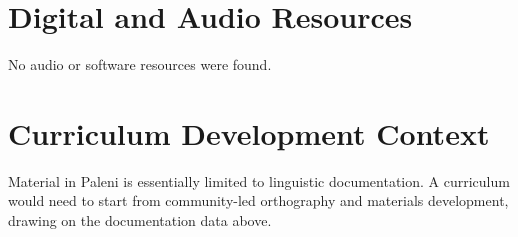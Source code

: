 \documentclass[12pt]{article}
\begin{document}
\section{Digital and Audio Resources}
No audio or software resources were found.

\section{Curriculum Development Context}
Material in Paleni is essentially limited to linguistic documentation. A curriculum would need to start from community-led orthography and materials development, drawing on the documentation data above.
\end{document}

